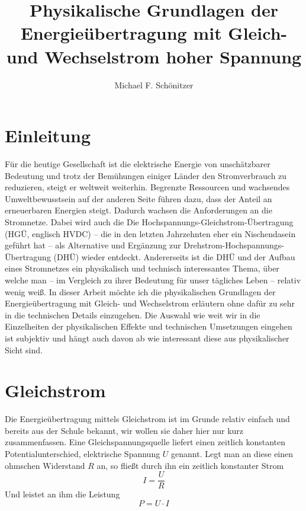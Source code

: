 \documentclass[10pt,a4paper,twoside]{article}
\author{Michael F. Schönitzer}
\title{Physikalische Grundlagen der Energieübertragung mit Gleich- und Wechselstrom hoher Spannung }
\begin{document}
\maketitle

\section{Einleitung}
Für die heutige Gesellschaft ist die elektrische Energie von unschätzbarer Bedeutung und trotz der Bemühungen einiger Länder den Stromverbrauch zu reduzieren, steigt er weltweit weiterhin. Begrenzte Ressourcen und wachsendes Umweltbewusstsein auf der anderen Seite führen dazu, dass der Anteil an erneuerbaren Energien steigt. Dadurch wachsen die Anforderungen an die Stromnetze. Dabei wird auch die Die Hochspannungs-Gleichstrom-Übertragung (HGÜ, englisch HVDC) -- die in den letzten Jahrzehnten eher ein Nischendasein geführt hat -- als Alternative und Ergänzung zur Drehstrom-Hochspannungs-Übertragung (DHÜ) wieder entdeckt.
Andererseits ist die DHÜ und der Aufbau eines Stromnetzes ein physikalisch und technisch interessantes Thema, über welche man -- im Vergleich zu ihrer Bedeutung für unser tägliches Leben -- relativ wenig weiß.
In dieser Arbeit möchte ich die physikalischen Grundlagen der Energieübertragung mit Gleich- und Wechselstrom erläutern ohne dafür zu sehr in die technischen Details einzugehen. Die Auswahl wie weit wir in die Einzelheiten der physikalischen Effekte und technischen Umsetzungen eingehen ist subjektiv und hängt auch davon ab wie interessant diese aus physikalischer Sicht sind.

\section{Gleichstrom}
Die Energieübertragung mittels Gleichstrom ist im Grunde relativ einfach und bereits aus der Schule bekannt, wir wollen sie daher hier nur kurz zusammenfassen.
Eine Gleichspannungsquelle liefert einen zeitlich konstanten Potentialunterschied, elektrische Spannung $U$ genannt. Legt man an diese einen ohmschen Widerstand $R$ an, so fließt durch ihn ein zeitlich konstanter Strom
\begin{equation}
I = \frac{U}{R}
\end{equation}
Und leistet an ihm die Leistung
\begin{equation}
P = U \cdot I
\end{equation}


\end{document}
